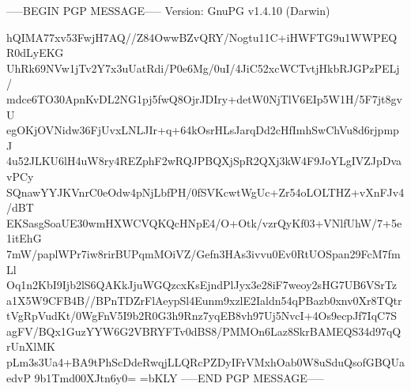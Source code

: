 -----BEGIN PGP MESSAGE-----
Version: GnuPG v1.4.10 (Darwin)

hQIMA77xv53FwjH7AQ//Z84OwwBZvQRY/Nogtu11C+iHWFTG9u1WWPEQR0dLyEKG
UhRk69NVw1jTv2Y7x3uUatRdi/P0e6Mg/0uI/4JiC52xcWCTvtjHkbRJGPzPELj/
mdce6TO30ApnKvDL2NG1pj5fwQ8OjrJDIry+detW0NjTlV6EIp5W1H/5F7jt8gvU
egOKjOVNidw36FjUvxLNLJIr+q+64kOsrHLsJarqDd2cHfImhSwChVu8d6rjpmpJ
4u52JLKU6lH4uW8ry4REZphF2wRQJPBQXjSpR2QXj3kW4F9JoYLgIVZJpDvavPCy
SQnawYYJKVnrC0eOdw4pNjLbfPH/0fSVKcwtWgUc+Zr54oLOLTHZ+vXnFJv4/dBT
EKSasgSoaUE30wmHXWCVQKQcHNpE4/O+Otk/vzrQyKf03+VNlfUhW/7+5e1itEhG
7mW/paplWPr7iw8rirBUPqmMOiVZ/Gefn3HAs3ivvu0Ev0RtUOSpan29FcM7fmLl
Oq1n2KbI9Ijb2lS6QAKkJjuWGQzcxKsEjndPlJyx3e28iF7weoy2sHG7UB6VSrTz
a1X5W9CFB4B//BPnTDZrFlAeypSl4Eunm9xzlE2Ialdn54qPBazb0xnv0Xr8TQtr
tVgRpVudKt/0WgFnV5I9b2R0G3h9Rnz7yqEB8vh97Uj5NvcI+4Os9ecpJf7IqC7S
agFV/BQx1GuzYYW6G2VBRYFTv0dBS8/PMMOn6Laz8SkrBAMEQS34d97qQrUnXlMK
pLm3s3Ua4+BA9tPhScDdeRwqjLLQRcPZDyIFrVMxhOab0W8uSduQsofGBQUaedvP
9b1Tmd00XJtn6y0=
=bKLY
-----END PGP MESSAGE-----

